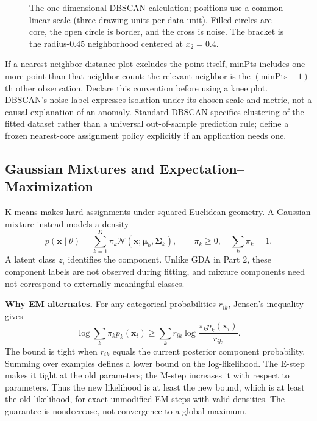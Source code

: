 \documentclass[11pt,twoside]{article}
\numberwithin{equation}{section}
\newcommand{\vect}[1]{\bm{#1}}
\newcommand{\mat}[1]{\bm{#1}}
\theoremstyle{plain}
\theoremstyle{definition}
\theoremstyle{remark}
\begin{document}
\begin{figure}[H]
\centering
{}
\caption{The one-dimensional DBSCAN calculation; positions use a common linear scale (three drawing units per data unit). Filled circles are core, the open circle is border, and the cross is noise. The bracket is the radius-$0.45$ neighborhood centered at $x_2=0.4$.}
\end{figure}
If a nearest-neighbor distance plot excludes the point itself, minPts includes one more point than that neighbor count: the relevant neighbor is the $(\text{minPts}-1)$th other observation. Declare this convention before using a knee plot. DBSCAN's noise label expresses isolation under its chosen scale and metric, not a causal explanation of an anomaly. Standard DBSCAN specifies clustering of the fitted dataset rather than a universal out-of-sample prediction rule; define a frozen nearest-core assignment policy explicitly if an application needs one.

\subsection{Gaussian Mixtures and Expectation--Maximization}
\label{sec:gmm-em}
K-means makes hard assignments under squared Euclidean geometry. A Gaussian mixture instead models a density
\[
p(\vect x\mid\theta)=\sum_{k=1}^K\pi_k\mathcal N(\vect x;\vect\mu_k,\mat\Sigma_k),
\qquad \pi_k\ge0,\quad\sum_k\pi_k=1.
\]
A latent class $z_i$ identifies the component. Unlike GDA in Part 2, these component labels are not observed during fitting, and mixture components need not correspond to externally meaningful classes.

\textbf{Why EM alternates.} For any categorical probabilities $r_{ik}$, Jensen's inequality gives
\[
\log\sum_k\pi_kp_k(\vect x_i)
\ge\sum_k r_{ik}\log\frac{\pi_kp_k(\vect x_i)}{r_{ik}}.
\]
The bound is tight when $r_{ik}$ equals the current posterior component probability. Summing over examples defines a lower bound on the log-likelihood. The E-step makes it tight at the old parameters; the M-step increases it with respect to parameters. Thus the new likelihood is at least the new bound, which is at least the old likelihood, for exact unmodified EM steps with valid densities. The guarantee is nondecrease, not convergence to a global maximum.
\end{document}
